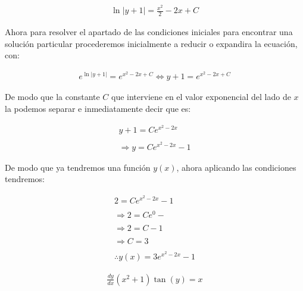\begin{equation*}
    \begin{gathered}
        \ln\left|y+1\right|=\frac{x^{2}}{2}-2x+C
    \end{gathered}
\end{equation*}

Ahora para resolver el apartado de las condiciones iniciales para encontrar una solución particular procederemos inicialmente a reducir o expandira la ecuación, con:

\begin{equation*}
    \begin{gathered}
        e^{\ln|y+1|}=e^{x^{2}-2x+C} \Leftrightarrow y+1=e^{x^{2}-2x+C}
    \end{gathered}
\end{equation*}

De modo que la constante \(\displaystyle C\) que interviene en el valor exponencial del lado de \(\displaystyle x\) la podemos separar e inmediatamente decir que es:

\begin{equation*}
    \begin{gathered}
        y+1=Ce^{x^{2}-2x}\\\\
        \Rightarrow y=Ce^{x^{2}-2x}-1
    \end{gathered}
\end{equation*}

De modo que ya tendremos una función \(\displaystyle y(x)\), ahora aplicando las condiciones tendremos:

\begin{equation*}
    \begin{gathered}
        2=Ce^{x^{2}-2x}-1\\\\
        \Rightarrow 2=Ce^{0}-\\\\
        \Rightarrow 2=C-1\\\\
        \Rightarrow C=3\\\\
        \therefore y(x)=3e^{x^{2}-2x}-1
    \end{gathered}
\end{equation*}

\clearpage
\begin{equation}
    \begin{gathered}
        \frac{dy}{dx}(x^{2}+1)\tan(y)=x
    \end{gathered}
\end{equation}


